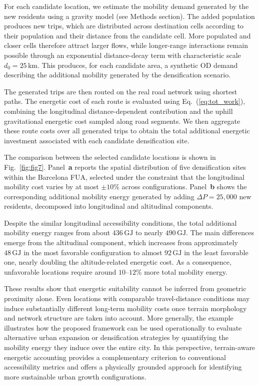 \documentclass[twocolumn,amsmath,amssymb,floatfix,nature,shownopacs,footinbib,superscriptaddress]{revtex4-2}
\begin{document}
For each candidate location, we estimate the mobility demand generated by the new residents using a gravity model (see Methods section). The added population produces new trips, which are distributed across destination cells according to their population and their distance from the candidate cell. More populated and closer cells therefore attract larger flows, while longer-range interactions remain possible through an exponential distance-decay term with characteristic scale $d_0=25\,\mathrm{km}$. This produces, for each candidate area, a synthetic OD demand describing the additional mobility generated by the densification scenario.

The generated trips are then routed on the real road network using shortest paths. The energetic cost of each route is evaluated using Eq.~(\ref{eq:tot_work}), combining the longitudinal distance-dependent contribution and the uphill gravitational energetic cost sampled along road segments. We then aggregate these route costs over all generated trips to obtain the total additional energetic investment associated with each candidate densification site.

The comparison between the selected candidate locations is shown in Fig.~\ref{fig:fig7}.
Panel~\textbf{a} reports the spatial distribution of five densification sites within the Barcelona FUA, selected under the constraint that the longitudinal mobility cost varies by at most $\pm10\%$ across configurations.
Panel~\textbf{b} shows the corresponding additional mobility energy generated by adding $\Delta P = 25{,}000$ new residents, decomposed into longitudinal and altitudinal components.

Despite the similar longitudinal accessibility conditions, the total additional mobility energy ranges from about $436\,\mathrm{GJ}$ to nearly $490\,\mathrm{GJ}$.
The main differences emerge from the altitudinal component, which increases from approximately $48\,\mathrm{GJ}$ in the most favorable configuration to almost $92\,\mathrm{GJ}$ in the least favorable one, nearly doubling the altitude-related energetic cost.
As a consequence, unfavorable locations require around $10$--$12\%$ more total mobility energy.

These results show that energetic suitability cannot be inferred from geometric proximity alone.
Even locations with comparable travel-distance conditions may induce substantially different long-term mobility costs once terrain morphology and network structure are taken into account.
More generally, the example illustrates how the proposed framework can be used operationally to evaluate alternative urban expansion or densification strategies by quantifying the mobility energy they induce over the entire city.
In this perspective, terrain-aware energetic accounting provides a complementary criterion to conventional accessibility metrics and offers a physically grounded approach for identifying more sustainable urban growth configurations.
\end{document}
